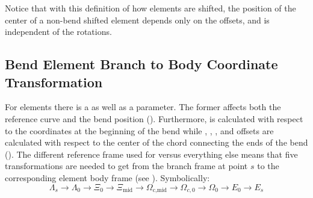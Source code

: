 Notice that with this definition of how elements are shifted, the position of the center of a
non-bend shifted element depends only on the offsets, and is independent of the rotations.

\subsection{Bend Element Branch to Body Coordinate Transformation}
\label{s:bend.mis}

For  elements there is a  as well as a  parameter.
The former affects both the reference curve and
the bend position (). Furthermore,  is calculated with respect to
the coordinates at the beginning of the bend while , ,
, and offsets are calculated with respect to the center of the chord connecting the
ends of the bend (). 
The different reference frame used
for  versus everything else means that five transformations are needed to get from the
branch frame at point $s$ to the corresponding element body frame (see ). Symbolically:
\begin{equation}
  \Lambda_s \longrightarrow \Lambda_0 \longrightarrow
  \Xi_0 \longrightarrow \Xi_\text{mid} \longrightarrow 
  \Omega_\text{c,mid} \longrightarrow \Omega_{c,0} \longrightarrow 
  \Omega_{0} \longrightarrow E_0 \longrightarrow E_s
\end{equation}

